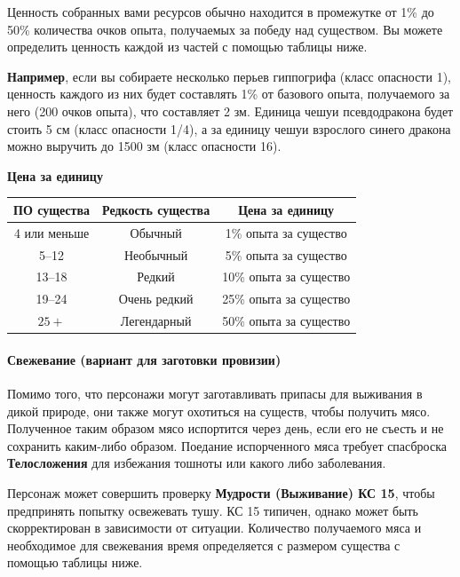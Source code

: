 \documentclass[a4paper, 9pt, twocolumn]{book}
\begin{document}
	Ценность собранных вами ресурсов обычно находится в промежутке от 1\% до 50\% количества очков опыта, получаемых за победу над существом. Вы можете определить ценность каждой из частей с помощью таблицы ниже.
	
	\textbf{Например}, если вы собираете несколько перьев гиппогрифа (класс опасности 1), ценность каждого из них будет составлять 1\% от базового опыта, получаемого за него (200 очков опыта), что составляет 2 зм. Единица чешуи псевдодракона будет стоить 5 см (класс опасности 1/4), а за единицу чешуи взрослого синего дракона можно выручить до 1500 зм (класс опасности 16).
	
	\textbf{Цена за единицу}
	
	\begin{center}
		\begin{tabular}{|c|c|c|}
			\hline
			\textbf{ПО существа} & \textbf{Редкость существа} & \textbf{Цена за единицу} \\
			\hline
			4 или меньше & Обычный & 1\% опыта за существо \\
			\hline
			5--12 & Необычный & 5\% опыта за существо \\
			\hline
			13--18 & Редкий & 10\% опыта за существо \\
			\hline
			19--24 & Очень редкий & 25\% опыта за существо  \\
			\hline
			$25+$ & Легендарный & 50\% опыта за существо \\
			\hline
		\end{tabular}
	\end{center}
	
	\paragraph*{Свежевание (вариант для заготовки провизии)}
	
	Помимо того, что персонажи могут заготавливать припасы для выживания в дикой природе, они также могут охотиться на существ, чтобы получить мясо. Полученное таким образом мясо испортится через день, если его не съесть и не сохранить каким-либо образом. Поедание испорченного мяса требует спасброска \textbf{Телосложения} для избежания тошноты или какого либо заболевания.
	
	Персонаж может совершить проверку \textbf{Мудрости (Выживание) КС 15}, чтобы предпринять попытку освежевать тушу. КС 15 типичен, однако может быть скорректирован в зависимости от ситуации. Количество получаемого мяса и необходимое для свежевания время определяется с размером существа с помощью таблицы ниже.
	
\end{document}
